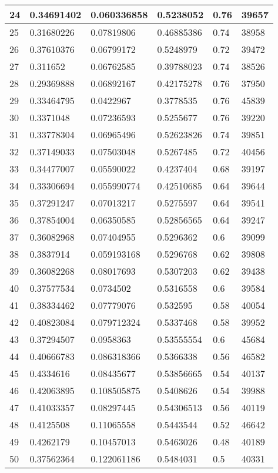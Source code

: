 \begin{longtable}{|l|l|l|l|l|l|}
24 & 0.34691402 & 0.060336858 & 0.5238052 & 0.76 & 39657 \\ \hline 
25 & 0.31680226 & 0.07819806 & 0.46885386 & 0.74 & 38958 \\ \hline 
26 & 0.37610376 & 0.06799172 & 0.5248979 & 0.72 & 39472 \\ \hline 
27 & 0.311652 & 0.06762585 & 0.39788023 & 0.74 & 38526 \\ \hline 
28 & 0.29369888 & 0.06892167 & 0.42175278 & 0.76 & 37950 \\ \hline 
29 & 0.33464795 & 0.0422967 & 0.3778535 & 0.76 & 45839 \\ \hline 
30 & 0.3371048 & 0.07236593 & 0.5255677 & 0.76 & 39220 \\ \hline 
31 & 0.33778304 & 0.06965496 & 0.52623826 & 0.74 & 39851 \\ \hline 
32 & 0.37149033 & 0.07503048 & 0.5267485 & 0.72 & 40456 \\ \hline 
33 & 0.34477007 & 0.05590022 & 0.4237404 & 0.68 & 39197 \\ \hline 
34 & 0.33306694 & 0.055990774 & 0.42510685 & 0.64 & 39644 \\ \hline 
35 & 0.37291247 & 0.07013217 & 0.5275597 & 0.64 & 39541 \\ \hline 
36 & 0.37854004 & 0.06350585 & 0.52856565 & 0.64 & 39247 \\ \hline 
37 & 0.36082968 & 0.07404955 & 0.5296362 & 0.6 & 39099 \\ \hline 
38 & 0.3837914 & 0.059193168 & 0.5296768 & 0.62 & 39808 \\ \hline 
39 & 0.36082268 & 0.08017693 & 0.5307203 & 0.62 & 39438 \\ \hline 
40 & 0.37577534 & 0.0734502 & 0.5316558 & 0.6 & 39584 \\ \hline 
41 & 0.38334462 & 0.07779076 & 0.532595 & 0.58 & 40054 \\ \hline 
42 & 0.40823084 & 0.079712324 & 0.5337468 & 0.58 & 39952 \\ \hline 
43 & 0.37294507 & 0.0958363 & 0.53555554 & 0.6 & 45684 \\ \hline 
44 & 0.40666783 & 0.086318366 & 0.5366338 & 0.56 & 46582 \\ \hline 
45 & 0.4334616 & 0.08435677 & 0.53856665 & 0.54 & 40137 \\ \hline 
46 & 0.42063895 & 0.108505875 & 0.5408626 & 0.54 & 39988 \\ \hline 
47 & 0.41033357 & 0.08297445 & 0.54306513 & 0.56 & 40119 \\ \hline 
48 & 0.4125508 & 0.11065558 & 0.5443544 & 0.52 & 46642 \\ \hline 
49 & 0.4262179 & 0.10457013 & 0.5463026 & 0.48 & 40189 \\ \hline 
50 & 0.37562364 & 0.122061186 & 0.5484031 & 0.5 & 40331 \\ \hline 
\end{longtable}
